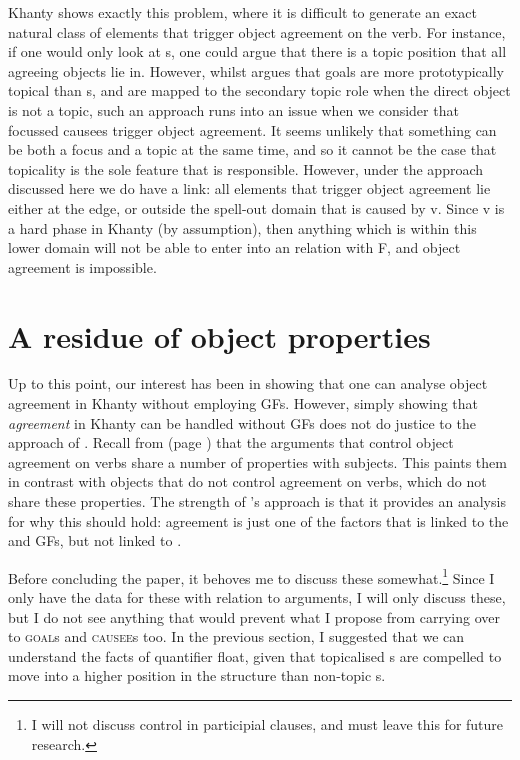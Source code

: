 \documentclass[output=paper
,modfonts
,nonflat]{langsci/langscibook}
\begin{document}
Khanty shows exactly this problem, where it is difficult to generate an exact natural class of elements that trigger object agreement on the verb. 
For instance, if one would only look at \theme s, one could argue that there is a topic position that all agreeing objects lie in.
However, whilst \citet{nikolaeva2001} argues that goals are more prototypically topical than \theme s, and are mapped to the secondary topic role when the direct object is not a topic, such an approach runs into an issue when we consider that focussed causees trigger object agreement.
It seems unlikely that something can be both a focus and a topic at the same time, and so it cannot be the case that topicality is the sole feature that is responsible.
However, under the approach discussed here we do have a link: all elements that trigger object agreement lie either at the edge, or outside the spell-out domain that is caused by v. 
Since v is a hard phase in Khanty (by assumption), then anything which is within this lower domain will not be able to enter into an \agree{} relation with F, and object agreement is impossible.

\section{A residue of object properties}\label{residue}

Up to this point, our interest has been in showing that one can analyse object agreement in Khanty without employing GFs. 
However, simply showing that \textit{agreement} in Khanty can be handled without GFs does not do justice to the approach of \citet{dn2011}.
Recall from  (page \pageref{tab:gfproperties}) that the arguments that control object agreement on verbs share a number of properties with subjects. 
This paints them in contrast with objects that do not control agreement on verbs, which do not share these properties. 
The strength of \citeauthor{dn2011}'s approach is that it provides an analysis for why this should hold: agreement is just one of the factors that is linked to the \subj{} and \object{} GFs, but not linked to \robj.

Before concluding the paper, it behoves me to discuss these somewhat.\footnote{I will not discuss control in participial clauses, and must leave this for future research.} 
Since I only have the data for these with relation to \theme{} arguments, I will only discuss these, but I do not see anything that would prevent what I propose from carrying over to \textsc{goal}s and \textsc{causee}s too.
In the previous section, I suggested that we can understand the facts of quantifier float, given that topicalised \theme s are compelled to move into a higher position in the structure than non-topic \theme s.
\end{document}
